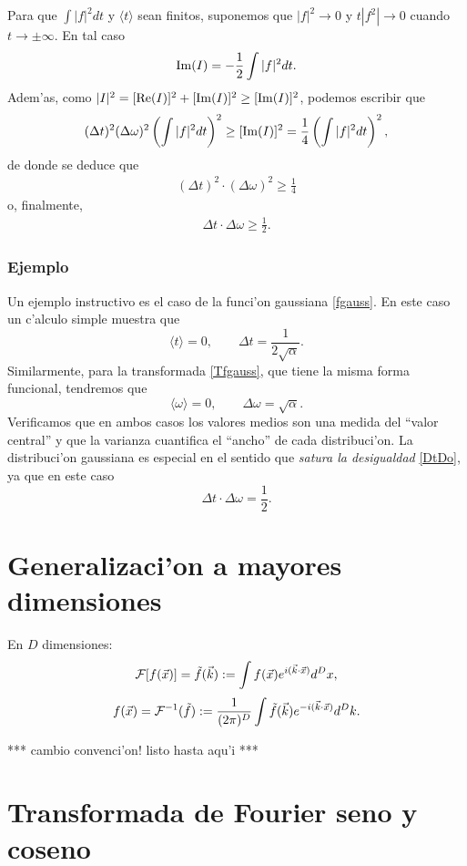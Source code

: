 Para que $\int |f|^2 dt$ y $\langle t \rangle$ sean finitos, suponemos que $|f|^2\rightarrow 0$ y $t|f^2| \rightarrow 0$ cuando $t \rightarrow \pm \infty$. En tal caso
\begin{align}
{\rm Im}(I)=-\frac{1}{2}\int |f|^2 dt.
\end{align}
Adem'as, como $|I|^2=[{\rm Re}(I)]^2+[{\rm Im}(I)]^2\geq [{\rm Im}(I)]^2$, podemos escribir que
\begin{align}
(\Delta t)^2 (\Delta \omega)^2 \left(\int |f|^2 dt \right)^2 \geq [{\rm Im}(I)]^2= \frac{1}{4} \left( \int |f|^2 dt\right)^2,
\end{align}
de donde se deduce que
\begin{align}
(\Delta t)^2 \cdot (\Delta\omega)^2 \geq \frac{1}{4}
\end{align}
o, finalmente,
\begin{align}\label{DtDo}
\boxed{
\Delta t\cdot \Delta\omega\ge\frac{1}{2}.
}
\end{align}

\subsubsection{Ejemplo}
Un ejemplo instructivo es el caso de la funci'on gaussiana \eqref{fgauss}. En este caso un c'alculo simple muestra que
\begin{equation}
\langle t\rangle=0,  \qquad \Delta t =\frac{1}{2\sqrt{\alpha}}.
\end{equation}
Similarmente, para la transformada \eqref{Tfgauss}, que tiene la misma forma funcional, tendremos que
\begin{equation}
\langle\omega\rangle=0,  \qquad \Delta\omega =\sqrt{\alpha}.
\end{equation}
Verificamos que en ambos casos los valores medios son una medida del ``valor central'' y que la varianza cuantifica el ``ancho'' de cada distribuci'on. La distribuci'on gaussiana es especial en el sentido que \textit{satura la desigualdad} \eqref{DtDo}, ya que en este caso
\begin{equation}
\Delta t\cdot \Delta\omega =\frac{1}{2}.
\end{equation}
\section{Generalizaci'on a mayores dimensiones}
En $D$ dimensiones:
\begin{equation}
{\cal F}[f(\vec{x})]=\tilde{f}(\vec{k})
:= \int f(\vec{x})e^{i(\vec{k}\cdot\vec{x})}d^Dx,
\end{equation}
\begin{equation}
f(\vec{x}) = {\cal F}^{-1}(\tilde{f})
:= \frac{1}{(2\pi)^{D}}\int \tilde{f}(\vec{k})e^{-i(\vec{k}\cdot\vec{x})}d^Dk.
\end{equation}

*** cambio convenci'on! listo hasta aqu'i ***


\section{Transformada de Fourier seno y coseno}










